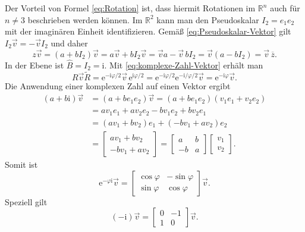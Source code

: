 \documentclass[a4paper,fleqn,11pt,dvipdfmx]{scrartcl}
\newcommand{\R}{\mathbb R}
\newcommand{\ui}{\mathrm i}
\newcommand{\ee}{\mathrm e}
\begin{document}

\noindent
Der Vorteil von Formel \eqref{eq:Rotation} ist, dass hiermit
Rotationen im $\R^n$ auch für $n\ne 3$ beschrieben werden können.
Im $\R^2$ kann man den Pseudoskalar $I_2=e_1e_2$ mit der
imaginären Einheit identifizieren. Gemäß \eqref{eq:Pseudoskalar-Vektor}
gilt $I_2\vec v=-\vec vI_2$ und daher
\begin{equation}\label{eq:komplexe-Zahl-Vektor}
z\vec v = (a+bI_2)\vec v = a\vec v+bI_2\vec v
= \vec v a -\vec v\,bI_2 = \vec v(a-bI_2) = \vec v\,\overline z.
\end{equation}
In der Ebene ist $\hat B=I_2=\ui$. Mit \eqref{eq:komplexe-Zahl-Vektor}
erhält man
\begin{equation}
R\vec v\tilde R = \ee^{-\ui\varphi/2}\vec v\,\ee^{\ui\varphi/2}
= \ee^{-\ui\varphi/2}\ee^{-\ui/\varphi/2}\vec v
= \ee^{-\ui\varphi}\vec v.
\end{equation}
Die Anwendung einer komplexen Zahl auf einen Vektor ergibt
\begin{align}
(a+b\ui)\vec v &= (a+be_1e_2)\vec v = (a+be_1e_2)(v_1e_1+v_2e_2)\\
&= av_1 e_1 + av_2 e_2 - bv_1 e_2 + bv_2 e_1\\
&= (av_1+bv_2)e_1+(-bv_1+av_2)e_2\\
&= \begin{bmatrix}
av_1+bv_2\\
-bv_1+av_2
\end{bmatrix}
= \begin{bmatrix}
a & b\\
-b & a
\end{bmatrix}\begin{bmatrix}
v_1\\ v_2
\end{bmatrix}.
\end{align}
Somit ist
\begin{equation}
\ee^{-\varphi\ui}\vec v = \begin{bmatrix}
\cos\varphi & -\sin\varphi\\
\sin\varphi & \cos\varphi
\end{bmatrix}\vec v.
\end{equation}
Speziell gilt
\begin{equation}
(-\ui)\vec v = \begin{bmatrix}
0 & -1\\
1 & 0
\end{bmatrix}\vec v.
\end{equation}
\end{document}
